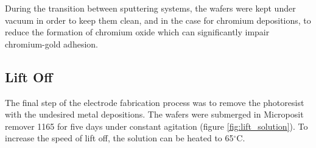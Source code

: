 \par During the transition between sputtering systems, the wafers were kept under vacuum in order to keep them clean, and in the case for chromium depositions, to reduce the formation of chromium oxide which can significantly impair chromium-gold adhesion.

\FloatBarrier

\subsection*{Lift Off}

The final step of the electrode fabrication process was to remove the photoresist with the undesired metal depositions. The wafers were submerged in Microposit remover 1165 for five days under constant agitation (figure \ref{fig:lift_solution}). To increase the speed of lift off, the solution can be heated to 65$^\circ$C.

